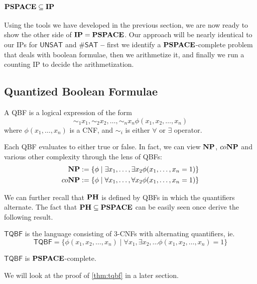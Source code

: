 \section{$\mathbf{PSPACE}\subseteq\mathbf{IP}$}
Using the tools we have developed in the previous section, we are now ready to show the other side of $\mathbf{IP}=\mathbf{PSPACE}$. Our approach will be nearly identical to our IPs for $\mathsf{UNSAT}$ and $\#\mathsf{SAT}$ \textbf{--} first we identify a $\mathbf{PSPACE}$-complete problem that deals with boolean formulae, then we arithmetize it, and finally we run a counting IP to decide the arithmetization.

\subsection{Quantized Boolean Formulae}

\begin{definition}
	A QBF is a logical expression of the form
	$$\sim_1x_1, \sim_2x_2,\dots, \sim_nx_n \phi(x_1,x_2,\dots,x_n)$$
	where $\phi(x_1,\dots,x_n)$ is a CNF, and $\sim_i$ is either $\forall$ or $\exists$ operator.
\end{definition}

Each QBF evaluates to either true or false. In fact, we can view $\mathbf{NP}$, $co\mathbf{NP}$ and various other complexity through the lens of QBFs:
\begin{align*}
	\mathbf{NP}&:=\{\phi\mid\exists x_1,\dots,\exists x_2\phi(x_1,\dots,x_n=1)\}\\
	co\mathbf{NP}&:=\{\phi\mid\forall x_1,\dots,\forall x_2\phi(x_1,\dots,x_n=1)\}
\end{align*}

We can further recall that $\mathbf{PH}$ is defined by QBFs in which the quantifiers alternate. The fact that $\mathbf{PH}\subseteq\mathbf{PSPACE}$ can be easily seen once derive the following result.

\begin{definition}[TQBF]
	$\mathsf{TQBF}$ is the language consisting of 3-CNFs with alternating quantifiers, ie.
	$$\mathsf{TQBF}=\{\phi(x_1,x_2,\dots,x_n)\mid\forall x_1,\exists x_2,\dots\phi(x_1,x_2,\dots,x_n)=1\}$$
\end{definition}

\begin{theorem}
	\label{thm:tqbf}
	$\mathsf{TQBF}$ is $\mathbf{PSPACE}$-complete.
\end{theorem}

We will look at the proof of \ref{thm:tqbf} in a later section.

